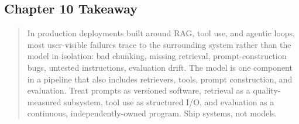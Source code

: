 \subsection{Chapter 10 Takeaway}

\begin{quote}
In production deployments built around RAG, tool use, and
agentic loops, most user-visible failures trace to the surrounding
system rather than the model in isolation: bad chunking, missing
retrieval, prompt-construction bugs, untested instructions,
evaluation drift. The model is one component in a pipeline that
also includes retrievers, tools, prompt construction, and
evaluation. Treat prompts as versioned software,
retrieval as a quality-measured subsystem, tool use as structured
I/O, and evaluation as a continuous, independently-owned program.
Ship systems, not models.
\end{quote}
